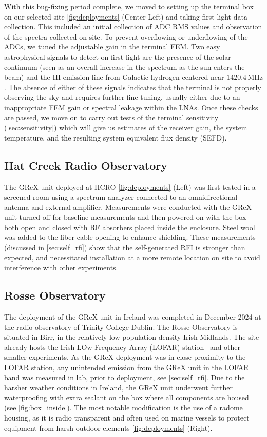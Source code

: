 With this bug-fixing period complete, we moved to setting up the terminal box on our selected site \autoref{fig:deployments} (Center Left) and taking first-light data collection. 
This included an initial collection of ADC RMS values and observation of the spectra collected on site. 
To prevent overflowing or underflowing of the ADCs, we tuned the adjustable gain in the terminal FEM. 
Two easy astrophysical signals to detect on first light are the presence of the solar continuum (seen as an overall increase in the spectrum as the sun enters the beam) and the HI emission line from Galactic hydrogen centered near $1420.4\,\text{MHz}$. 
The absence of either of these signals indicates that the terminal is not properly observing the sky and requires further fine-tuning, usually either due to an inappropriate FEM gain or spectral leakage within the LNAs. 
Once these checks are passed, we move on to carry out tests of the terminal sensitivity (\autoref{sec:sensitivity}) which will give us estimates of the receiver gain, the system temperature, and the resulting system equivalent flux density (SEFD).

\subsection{Hat Creek Radio Observatory}

The GReX unit deployed at HCRO \autoref{fig:deployments} (Left) was first tested in a screened room using a spectrum analyzer connected to an omnidirectional antenna and external amplifier.
Measurements were conducted with the GReX unit turned off for baseline measurements and then powered on with the box both open and closed with RF absorbers placed inside the enclosure.
Steel wool was added to the fiber cable opening to enhance shielding.
These measurements (discussed in \autoref{sec:self_rfi}) show that the self-generated RFI is stronger than expected, and necessitated installation at a more remote location on site to avoid interference with other experiments.

\subsection{Rosse Observatory}
The deployment of the GReX unit in Ireland was completed in December 2024 at the radio observatory of Trinity College Dublin.
The Rosse Observatory is situated in Birr, in the relatively low population density Irish Midlands.
The site already hosts the Irish LOw Frequency Array (LOFAR) station~\cite{vanhaarlemLOFARLOwFrequencyARray2013,murphyFirstResultsREALtime2021} and other smaller experiments.
As the GReX deployment was in close proximity to the LOFAR station, any unintended emission from the GReX unit in the LOFAR band was measured in lab, prior to deployment, see \autoref{sec:self_rfi}.
Due to the harsher weather conditions in Ireland, the GReX unit underwent further waterproofing with extra sealant on the box where all components are housed (see \autoref{fig:box_inside}).
The most notable modification is the use of a radome housing, as it is radio transparent and often used on marine vessels to protect equipment from harsh outdoor elements \autoref{fig:deployments} (Right).


